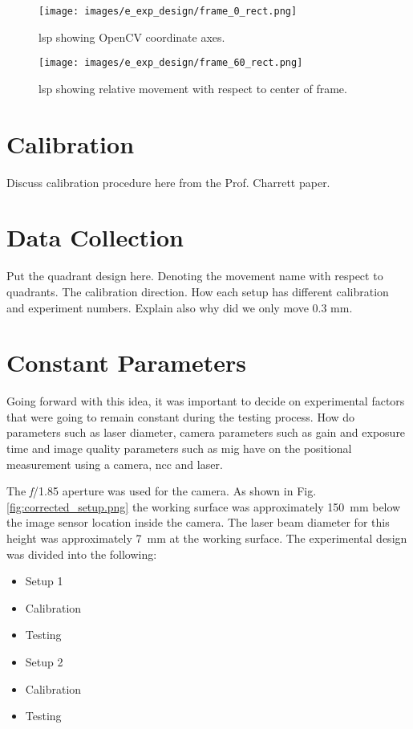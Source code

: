         \begin{figure}[h]
            \centering
            \texttt{[image: images/e\_exp\_design/frame\_0\_rect.png]}
            \caption{\gls{lsp} showing OpenCV coordinate axes.}
            \label{fig:frame_0_rect.png}
        \end{figure}
        
        \begin{figure}[h]
            \centering
            \texttt{[image: images/e\_exp\_design/frame\_60\_rect.png]}
            \caption{\gls{lsp} showing relative movement with respect to center of frame.}
            \label{fig:frame_60_rect.png}
        \end{figure}

\vspace{5mm}

\section{Calibration}\label{section:calibration}
Discuss calibration procedure here from the Prof. Charrett paper. 


\section{Data Collection}\label{section:data_collection}
Put the quadrant design here. Denoting the movement name with respect to quadrants. The calibration direction. How each setup has different calibration and experiment numbers. Explain also why did we only move 0.3 mm.

\section{Constant Parameters}\label{section:constant_parameters}

\noindent Going forward with this idea, it was important to decide on experimental factors that were going to remain constant during the testing process. How do parameters such as laser diameter, camera parameters such as gain and exposure time and image quality parameters such as \gls{mig} have on the positional measurement using a camera, \gls{ncc} and laser. 

\vspace{5mm}

\noindent The \emph{f}/1.85 aperture was used for the camera. As shown in Fig. \ref{fig:corrected_setup.png} the working surface was approximately \SI{150}{\milli\meter} below the image sensor location inside the camera. The laser beam diameter for this height was approximately \SI{7}{\milli\meter} at the working surface. The experimental design was divided into the following:
\begin{itemize}
    \item Setup 1
    \item Calibration
    \item Testing
    \item Setup 2
    \item Calibration
    \item Testing
\end{itemize}

